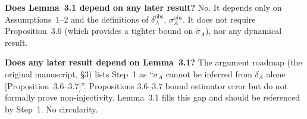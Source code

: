 \begin{circularity-check}
\textbf{Does Lemma~3.1 depend on any later result?} No. It depends only
on Assumptions~1--2 and the definitions of $\delta_A^{\text{obs}}$,
$\sigma_A^{\text{obs}}$. It does not require Proposition~3.6 (which
provides a tighter bound on $\tilde{\sigma}_A$), nor any dynamical
result.

\textbf{Does any later result depend on Lemma~3.1?} The argument roadmap
(the original manuscript, \S3) lists Step~1 as ``$\sigma_A$ cannot be
inferred from $\delta_A$ alone [Proposition~3.6--3.7]''. Propositions
3.6--3.7 bound estimator error but do not formally prove
non-injectivity. Lemma~3.1 fills this gap and should be referenced
by Step~1. No circularity.
\end{circularity-check}

